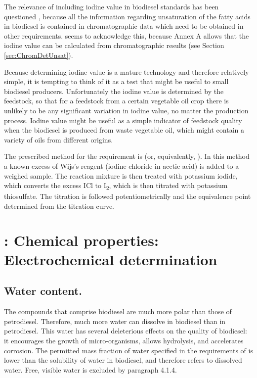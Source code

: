 The relevance of including iodine value in biodiesel standards has been
questioned \autocite{Knothe2002}, because all the information regarding
unsaturation of the fatty acids in biodiesel is contained in chromatographic
data which need to be obtained in other requirements.  seems to
acknowledge this, because Annex A allows that the iodine value can be calculated
from chromatographic results (see Section \ref{sec:ChromDetUnsat}).

Because determining iodine value is a mature technology and therefore relatively
simple, it is tempting to think of it as a test that might be useful to small
biodiesel producers. Unfortunately the iodine value is determined by the
feedstock, so that for a feedstock from a certain vegetable oil crop there is
unlikely to be any significant variation in iodine value, no matter the
production process. Iodine value might be useful as a simple indicator of
feedstock quality when the biodiesel is produced from waste vegetable oil, which
might contain a variety of oils from different origins.

The prescribed method for the requirement is  (or, equivalently,
). In this method a known excess of Wijs's reagent (iodine
chloride in acetic acid) is added to a weighed sample. The reaction mixture is
then treated with potassium iodide, which converts the excess ICl to
I\textsubscript{2}, which is then titrated with potassium thiosulfate. The
titration is followed potentiometrically and the equivalence point determined
from the titration curve.

\section{\texorpdfstring{}{SANS 1935}: Chemical properties: Electrochemical determination}

\subsection{Water content.}

The compounds that comprise biodiesel are much more polar than those of
petro\-diesel. Therefore, much more water can dissolve in biodiesel than in
petrodiesel. This water has several deleterious effects on the quality of
biodiesel: it encourages the growth of micro-organisms, allows hydrolysis, and
accelerates corrosion. The permitted mass fraction of water specified in the
requirements of  is lower than the solubility of water in
biodiesel, and therefore refers to dissolved water. Free, visible water is
excluded by paragraph 4.1.4.

